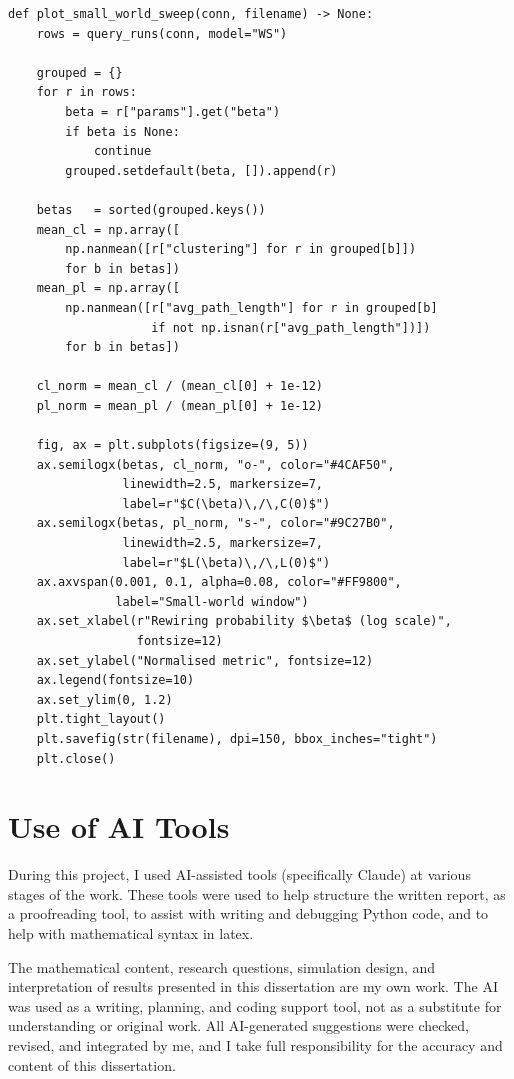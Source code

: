 \documentclass[12pt, a4paper]{report}
\theoremstyle{definition}
\theoremstyle{plain}
\theoremstyle{remark}
\begin{document}
\begin{lstlisting}[style=python,
    caption={Small-world normalisation. Clustering and path length are
      divided by their values at $\beta = 0$ (the first entry in the
      sorted sweep), implementing the theory-driven normalisation
      discussed in Chapter~\ref{chap:ws}.},
    label={lst:ws_plot}]
def plot_small_world_sweep(conn, filename) -> None:
    rows = query_runs(conn, model="WS")

    grouped = {}
    for r in rows:
        beta = r["params"].get("beta")
        if beta is None:
            continue
        grouped.setdefault(beta, []).append(r)

    betas   = sorted(grouped.keys())
    mean_cl = np.array([
        np.nanmean([r["clustering"] for r in grouped[b]])
        for b in betas])
    mean_pl = np.array([
        np.nanmean([r["avg_path_length"] for r in grouped[b]
                    if not np.isnan(r["avg_path_length"])])
        for b in betas])

    cl_norm = mean_cl / (mean_cl[0] + 1e-12)
    pl_norm = mean_pl / (mean_pl[0] + 1e-12)

    fig, ax = plt.subplots(figsize=(9, 5))
    ax.semilogx(betas, cl_norm, "o-", color="#4CAF50",
                linewidth=2.5, markersize=7,
                label=r"$C(\beta)\,/\,C(0)$")
    ax.semilogx(betas, pl_norm, "s-", color="#9C27B0",
                linewidth=2.5, markersize=7,
                label=r"$L(\beta)\,/\,L(0)$")
    ax.axvspan(0.001, 0.1, alpha=0.08, color="#FF9800",
               label="Small-world window")
    ax.set_xlabel(r"Rewiring probability $\beta$ (log scale)",
                  fontsize=12)
    ax.set_ylabel("Normalised metric", fontsize=12)
    ax.legend(fontsize=10)
    ax.set_ylim(0, 1.2)
    plt.tight_layout()
    plt.savefig(str(filename), dpi=150, bbox_inches="tight")
    plt.close()
\end{lstlisting}

\chapter{Use of AI Tools}
\label{app:ai}

During this project, I used AI-assisted tools (specifically Claude) at various stages of the work. 
These tools were used to help structure the written report, as a proofreading tool, to assist 
with writing and debugging Python code, and to help with mathematical syntax in latex.

The mathematical content, research questions, simulation design, and interpretation of results 
presented in this dissertation are my own work. The AI was used as a writing, planning, and coding 
support tool, not as a substitute for understanding or original work. All AI-generated suggestions 
were checked, revised, and integrated by me, and I take full responsibility for the accuracy and 
content of this dissertation.
\end{document}
